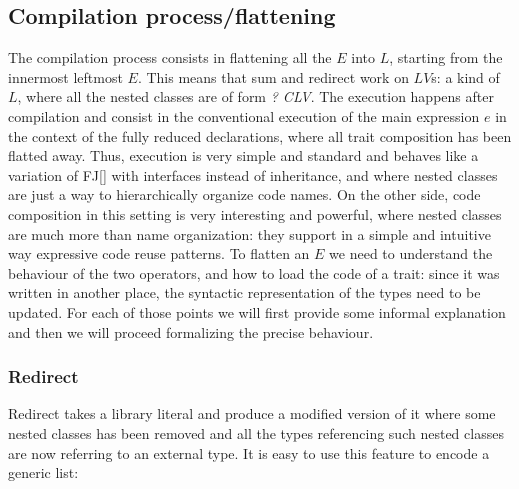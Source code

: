 \subsection{Compilation process/flattening}
The compilation process consists in flattening all the $E$ into $L$,
starting from the innermost leftmost $E$. This means that sum and redirect work on $LV$s:
a kind of $L$, where all the nested classes are of form \textit{\Q@private@? C\eq{}LV}.
The execution happens after compilation and consist in the conventional execution of the main expression $e$
in the context of the fully reduced declarations, where all trait composition has
been flatted away.
Thus, execution is very simple and standard and behaves like a variation of FJ[] with interfaces
instead of inheritance, and where nested classes are just a way to hierarchically organize code names.
On the other side, code composition in this setting is very interesting and powerful, where
nested classes are much more than name organization: they support in a simple and intuitive way
expressive code reuse patterns.
To flatten an $E$ we need to understand the behaviour of the two operators, and how to 
load the code of a trait: since it was written in another place, the syntactic representation of
the types need to be updated.
For each of those points we will first provide some informal explanation and then we will proceed formalizing
the precise behaviour.

\subsubsection{Redirect}

Redirect %
takes a library literal and produce a modified version of it where some nested classes has been removed
and all the types referencing such nested classes are now referring to an external type. It is easy to use this feature to encode a generic list:

